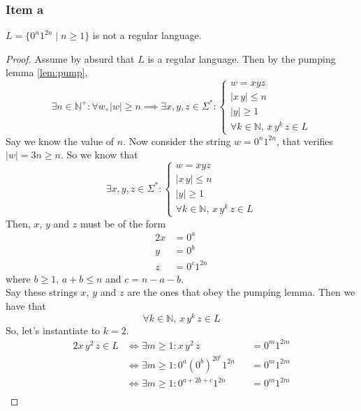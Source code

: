 \documentclass[docid=TP07]{tcom_TP}
\begin{document}
{\subsubsection{Item a}
\begin{theorem}
	$L=\{0^n1^{2n}\mid n\geq 1\}$ is not a regular language.
\end{theorem}
\begin{proof}
Assume by absurd that $L$ is a regular language. Then by the pumping lemma \eqref{lem:pump},
\begin{equation*}
	\exists n \in \mathbb{N}^+ \colon \forall w, |w|\geq n \implies \exists x, y, z \in \Sigma^* \colon 
	\begin{cases}
		w = xyz \\
		|x\,y| \leq n\\
		|y| \geq 1\\
		\forall k \in \mathbb{N},\,x\,y^k\,z \in L
\end{cases}
\end{equation*}
Say we know the value of $n$. Now consider the string $w=0^n1^{2n}$, that verifies $|w|=3n \geq n$. So we know that
\begin{equation*}
\exists x, y, z \in \Sigma^* \colon 
\begin{cases}
	w = xyz \\
	|x\,y| \leq n\\
	|y| \geq 1\\
	\forall k \in \mathbb{N},\,x\,y^k\,z \in L
\end{cases}
\end{equation*}
Then, $x$, $y$ and $z$ must be of the form
\begin{alignat*}{2}
	x &= 0^a\\
	y &= 0^b\\
	z &= 0^c1^{2n}
\end{alignat*}
where $b \geq 1$, $a+b \leq n$ and $c=n-a-b$.\\
Say these strings $x$, $y$ and $z$ are the ones that obey the pumping lemma. Then we have that
\begin{equation*}
	\forall k \in \mathbb{N},\,x\,y^k\,z \in L
\end{equation*}
So, let's instantiate to $k=2$.
\begin{alignat*}{2}
	x\,y^2\,z \in L
	& \iff \exists m \geq 1 \colon x\,y^2\,z           &&= 0^m1^{2m} \\
	& \iff \exists m \geq 1 \colon 0^a(0^b)^20^c1^{2n} &&= 0^m1^{2m} \\
	& \iff \exists m \geq 1 \colon 0^{a+2b+c}1^{2n}    &&= 0^m1^{2m} \\

\end{alignat*}
\end{proof}}
\end{document}
